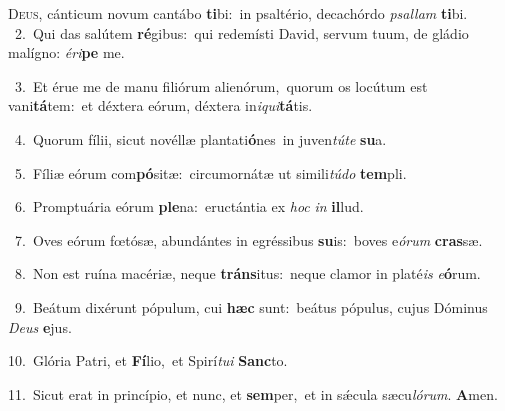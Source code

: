 \lettrine{\initial\textcolor{\initialcolor}{D}}{eus,} cánticum novum cantábo \textbf{ti}\-bi:~\star in psaltério, decachórdo \textit{psal}\-\textit{lam} \textbf{ti}\-bi.\\
{\numbfont\textcolor{\numbcolor}{~2.}}~Qui das salútem \textbf{ré}\-gibus:~\star qui redemísti David, servum tuum, de gládio malígno: \textit{é}\-\textit{ri}\textbf{pe} me.\par
{\numbfont\textcolor{\numbcolor}{~3.}}~Et érue me de manu filiórum alienórum,~\dagger quorum os locútum est vani\-\textbf{tá}\-tem:~\star et déxtera eórum, déxtera in\-\textit{i}\-\textit{qui}\textbf{tá}tis.\par
{\numbfont\textcolor{\numbcolor}{~4.}}~Quorum fílii, sicut novéllæ plantati\-\textbf{ó}\-nes~\star in juven\-\textit{tú}\-\textit{te} \textbf{su}\-a.\par
{\numbfont\textcolor{\numbcolor}{~5.}}~Fíliæ eórum com\-\textbf{pó}\-sitæ:~\star circumornátæ ut simili\-\textit{tú}\-\textit{do} \textbf{tem}\-pli.\par
{\numbfont\textcolor{\numbcolor}{~6.}}~Promptuária eórum \textbf{ple}\-na:~\star eructántia ex \textit{hoc} \textit{in} \textbf{il}\-lud.\par
{\numbfont\textcolor{\numbcolor}{~7.}}~Oves eórum fœtósæ, abundántes in egréssibus \textbf{su}\-is:~\star boves e\-\textit{ó}\-\textit{rum} \textbf{cras}\-sæ.\par
{\numbfont\textcolor{\numbcolor}{~8.}}~Non est ruína macériæ, neque \textbf{tráns}\-itus:~\star neque clamor in platé\textit{is} \textit{e}\-\textbf{ó}rum.\par
{\numbfont\textcolor{\numbcolor}{~9.}}~Beátum dixérunt pópulum, cui \textbf{hæc} sunt:~\star beátus pópulus, cujus Dóminus \textit{De}\-\textit{us} \textbf{e}\-jus.\par
{\numbfont\textcolor{\numbcolor}{10.}}~Glória Patri, et \textbf{Fí}\-lio,~\star et Spirí\-\textit{tu}\-\textit{i} \textbf{Sanc}\-to.\par
{\numbfont\textcolor{\numbcolor}{11.}}~Sicut erat in princípio, et nunc, et \textbf{sem}\-per,~\star et in sǽcula sæcu\-\textit{ló}\-\textit{rum}. \textbf{A}\-men.\par
